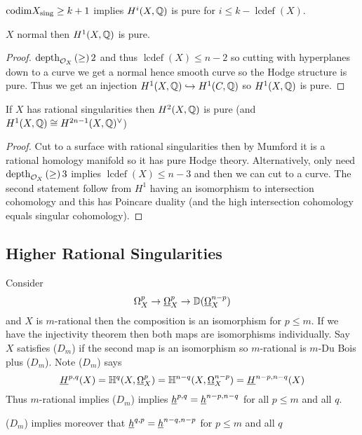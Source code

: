 \documentclass[12pt]{article}
\newcommand{\HH}{\mathbb{H}}
\renewcommand{\codim}{\mathrm{codim}}
\DeclareMathOperator{\lcdef}{\mathrm{lcdef}}
\begin{document}
\begin{cor}
$\codim{X_{\sing}} \ge k + 1$ implies $H^i(X, \mathbb{Q})$ is pure for $i \le k - \lcdef(X)$. 
\end{cor}

\begin{cor}
$X$ normal then $H^1(X, \mathbb{Q})$ is pure.
\end{cor}

\begin{proof}
$\mathrm{depth}_{\mathcal{O}_{X}} \left( \ge \right) 2$ and thus $\lcdef(X) \le n - 2$ so cutting with hyperplanes down to a curve we get a normal hence smooth curve so the Hodge structure is pure. Thus we get an injection $H^1(X, \mathbb{Q}) \hookrightarrow H^1(C, \mathbb{Q})$ so $H^1(X, \mathbb{Q})$ is pure.
\end{proof}

\begin{cor}
If $X$ has rational singularities then $H^2(X, \mathbb{Q})$ is pure (and $H^1(X, \mathbb{Q}) \cong H^{2n-1}(X, \mathbb{Q})^\vee$)
\end{cor}

\begin{proof}
Cut to a surface with rational singularities then by Mumford it is a rational homology manifold so it has pure Hodge theory. Alternatively, only need $\mathrm{depth}_{\mathcal{O}_{X}} \left( \ge \right) 3$ implies $\lcdef(X) \le n - 3$ and then we can cut to a curve. The second statement follow from $H^1$ having an isomorphism to intersection cohomology and this has Poincare duality (and the high intersection cohomology equals singular cohomology). 
\end{proof}

\subsection{Higher Rational Singularities}

Consider
\[ \Omega_X^p \to \underline{\Omega}_X^p \to \mathbb{D}(\underline{\Omega}_X^{n-p}) \]
and $X$ is $m$-rational then the composition is an isomorphism for $p \le m$. If we have the injectivity theorem then both maps are isomorphisms individually. Say $X$ satisfies ($D_m$)  if the second map is an isomorphism so $m$-rational is $m$-Du Bois plus ($D_m$). Note ($D_m$) says
\[ \ul{H}^{p,q}(X) = \HH^q(X, \ulO_X^p) = \HH^{n-q}(X, \ulO_X^{n-p}) = \ul{H}^{n-p,n-q}(X) \]
Thus $m$-rational implies ($D_m$) implies $\underline{h}^{p,q} = \underline{h}^{n-p,n-q}$ for all $p \le m$ and all $q$. 

\begin{theorem}
($D_m$) implies moreover that $\underline{h}^{q,p} = \underline{h}^{n-q,n-p}$ for $p \le m$ and all $q$ 
\end{theorem}
\end{document}
